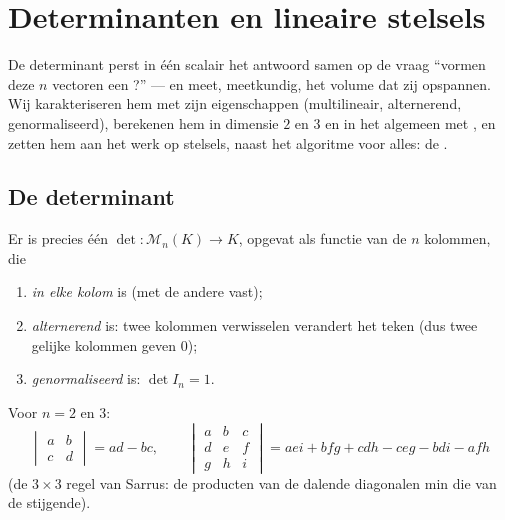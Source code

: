 \chapter{Determinanten en lineaire stelsels}\label{ch:b1:det}

De determinant perst in één scalair het antwoord samen op de vraag
``vormen deze $n$ vectoren een ?'' --- en meet, meetkundig, het
volume dat zij opspannen. Wij karakteriseren hem met zijn
eigenschappen (multilineair, alternerend, genormaliseerd), berekenen
hem in dimensie $2$ en $3$ en in het algemeen met
, en zetten hem aan het werk op 
stelsels, naast het algoritme voor alles: de .

\section{De determinant}

\begin{theorem}[Karakterisering]\label{thm:b1:det:def}
Er is precies één  $\det \colon \mathcal{M}_n(K) \to K$,
opgevat als functie van de $n$ kolommen, die
\begin{enumerate}
  \item \emph{ in elke kolom} is (met de andere vast);
  \item \emph{alternerend} is: twee kolommen verwisselen verandert
        het teken (dus twee gelijke kolommen geven $0$);
  \item \emph{genormaliseerd} is: $\det I_n = 1$.
\end{enumerate}
Voor $n = 2$ en $3$:
\[
\begin{vmatrix} a & b\\ c & d\end{vmatrix} = ad - bc,
\qquad
\begin{vmatrix} a & b & c\\ d & e & f\\ g & h & i\end{vmatrix}
= aei + bfg + cdh - ceg - bdi - afh
\]
(de $3 \times 3$ regel van Sarrus: de producten van de dalende
diagonalen min die van de stijgende).
\end{theorem}
\admitted

